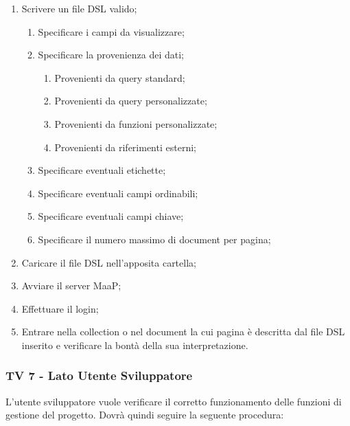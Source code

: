 \begin{enumerate}
\item Scrivere un file DSL valido;
\begin{enumerate}
\item Specificare i campi da visualizzare;
\item Specificare la provenienza dei dati;
\begin{enumerate}
\item Provenienti da query standard;
\item Provenienti da query personalizzate;
\item Provenienti da funzioni personalizzate;
\item Provenienti da riferimenti esterni;
\end{enumerate}
\item Specificare eventuali etichette;
\item Specificare eventuali campi ordinabili;
\item Specificare eventuali campi chiave;
\item Specificare il numero massimo di document per pagina;
\end{enumerate}
\item Caricare il file DSL nell'apposita cartella;
\item Avviare il server MaaP;
\item Effettuare il login;
\item Entrare nella collection o nel document la cui pagina è descritta dal file DSL inserito e verificare la bontà della sua interpretazione.
\end{enumerate}



\subsubsection{TV 7 - Lato Utente Sviluppatore}

L’utente sviluppatore vuole verificare il corretto funzionamento delle funzioni di gestione del progetto.
Dovrà quindi seguire la seguente procedura:

